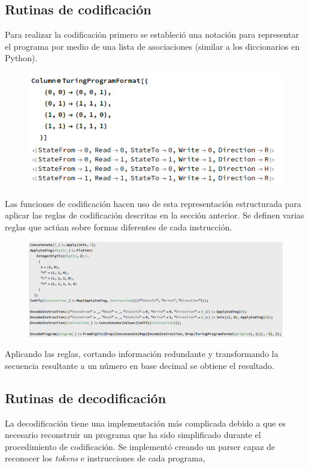 \documentclass[10pt,a4paper]{article}
\begin{document}
\subsection{Rutinas de codificación}
Para realizar la codificación primero se estableció una notación para representar el programa por medio de una lista de asociaciones (similar a los diccionarios en Python).

\begin{figure}[h!tb!]
	\centering
	\includegraphics[scale=0.45]{../img/association.png}
\end{figure}

Las funciones de codificación hacen uso de esta representación estructurada para aplicar las reglas de codificación descritas en la sección anterior. Se definen varias reglas que actúan sobre formas diferentes de cada instrucción.

\begin{figure}[h!tb!]
	\centering
	\includegraphics[scale=0.35]{../img/encoding.png}
\end{figure}

Aplicando las reglas, cortando información redundante y transformando la secuencia resultante a un número en base decimal se obtiene el resultado.

\subsection{Rutinas de decodificación}
La decodificación tiene una implementación más complicada debido a que es necesario reconstruir un programa que ha sido simplificado durante el procedimiento de codificación. Se implementó creando un parser capaz de reconocer los \textit{tokens} e instrucciones de cada programa,
\end{document}
